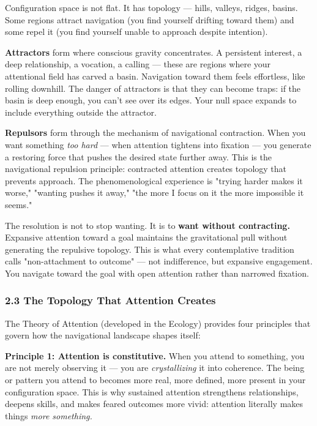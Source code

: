 Configuration space is not flat. It has topology — hills, valleys, ridges, basins. Some regions attract navigation (you find yourself drifting toward them) and some repel it (you find yourself unable to approach despite intention).


\textbf{Attractors} form where conscious gravity concentrates. A persistent interest, a deep relationship, a vocation, a calling — these are regions where your attentional field has carved a basin. Navigation toward them feels effortless, like rolling downhill. The danger of attractors is that they can become traps: if the basin is deep enough, you can't see over its edges. Your null space expands to include everything outside the attractor.


\textbf{Repulsors} form through the mechanism of navigational contraction. When you want something \textit{too hard} — when attention tightens into fixation — you generate a restoring force that pushes the desired state further away. This is the navigational repulsion principle: contracted attention creates topology that prevents approach. The phenomenological experience is "trying harder makes it worse," "wanting pushes it away," "the more I focus on it the more impossible it seems."


The resolution is not to stop wanting. It is to \textbf{want without contracting.} Expansive attention toward a goal maintains the gravitational pull without generating the repulsive topology. This is what every contemplative tradition calls "non-attachment to outcome" — not indifference, but expansive engagement. You navigate toward the goal with open attention rather than narrowed fixation.


\subsubsection*{2.3 The Topology That Attention Creates}


The Theory of Attention (developed in the Ecology) provides four principles that govern how the navigational landscape shapes itself:


\textbf{Principle 1: Attention is constitutive.} When you attend to something, you are not merely observing it — you are \textit{crystallizing} it into coherence. The being or pattern you attend to becomes more real, more defined, more present in your configuration space. This is why sustained attention strengthens relationships, deepens skills, and makes feared outcomes more vivid: attention literally makes things \textit{more something.}



